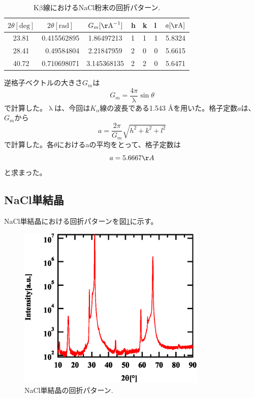 \documentclass[11pt,a4j,uplatex]{jsarticle}
\begin{document}
\begin{table}[tbp]
 \begin{center}
  \caption{$\mathrm{K\beta}$線におけるNaCl粉末の回折パターン.}
  \begin{tabular}{|c|r|c|lll|c|}  \hline
   $2\theta[\mathrm{deg}]$ & \multicolumn{1}{c|}{$2\theta[\mathrm{rad}]$} & $G_{m}[\mathrm{\AA}^{-1}]$ & h & k & l & $a[\mathrm{\AA}]$ \\ \hline  \hline
   23.81                   & 0.415562895                                  & 1.86497213                 & 1 & 1 & 1 & 5.8324            \\
   28.41                   & 0.49584804                                   & 2.21847959                 & 2 & 0 & 0 & 5.6615            \\
   40.72                   & 0.710698071                                  & 3.145368135                & 2 & 2 & 0 & 5.6471            \\\hline
  \end{tabular}
  \label{powb}
 \end{center}
\end{table}

\newpage
逆格子ベクトルの大きさ$G_{m}$は
\begin{equation}
 G_m=\frac{4\pi}{\uplambda}\sin\theta
 \label{gyakukousi}
\end{equation}
で計算した。$\uplambda$は、今回は$K_\alpha$線の波長である1.543 \AA を用いた。格子定数$a$は、$G_{m}$から
\begin{equation}
 a=\frac{2\pi}{G_m}\sqrt{h^2+k^2+l^2}
 \label{kousiteisuu}
\end{equation}
で計算した。各$\theta$におけるaの平均をとって、格子定数は
\begin{equation}
 \nonumber
 a=5.6667 \AA
 \label{complete}
\end{equation}
と求まった。

\newpage
\subsection{NaCl単結晶}



NaCl単結晶における回折パターンを図\ref{bulk}に示す。

\begin{figure}[htb]
 \centering
 \includegraphics[clip,width=9cm]{FigBulk.eps}
 \caption{NaCl単結晶の回折パターン.}
 \label{bulk}
\end{figure}
\end{document}
